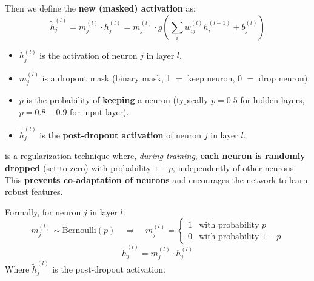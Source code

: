 Then we define the \textbf{new (masked) activation} as:
\begin{equation}
    \tilde{h}_j^{(l)} = m_j^{(l)} \cdot h_j^{(l)} = m_j^{(l)} \cdot g\left( \sum_{i} w_{ij}^{(l)} h_i^{(l-1)} + b_j^{(l)} \right)
\end{equation}
\begin{itemize}
    \item $h_j^{(l)}$ is the activation of neuron $j$ in layer $l$.
    \item $m_j^{(l)}$ is a dropout mask (binary mask, 1 $=$ keep neuron, 0 $=$ drop neuron).
    \item $p$ is the probability of \textbf{keeping} a neuron (typically $p=0.5$ for hidden layers, $p=0.8-0.9$ for input layer).
    \item $\tilde{h}_j^{(l)}$ is the \textbf{post-dropout activation} of neuron $j$ in layer $l$.
\end{itemize}

\begin{definitionbox}[: Dropout]
     is a regularization technique where, \emph{during training}, \textbf{each neuron is randomly dropped} (set to zero) with probability $1-p$, independently of other neurons. This \textbf{prevents co-adaptation of neurons} and encourages the network to learn robust features.

    \highspace
    Formally, for neuron $j$ in layer $l$:
    \begin{equation*}
        m_j^{(l)} \sim \text{Bernoulli}(p) \quad \Rightarrow \quad m_j^{(l)} = \begin{cases}
            1 & \text{with probability } p \\
            0 & \text{with probability } 1-p
        \end{cases}
    \end{equation*}
    \begin{equation*}
        \tilde{h}_j^{(l)} = m_j^{(l)} \cdot h_j^{(l)}
    \end{equation*}
    Where $\tilde{h}_j^{(l)}$ is the post-dropout activation.
\end{definitionbox}

